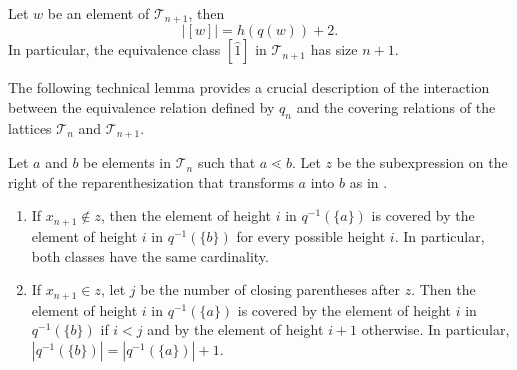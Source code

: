 \documentclass{preprint}
\newcommand{\cT}{\mathcal{T}}
\theoremstyle{definition}
\begin{document}
\begin{corollary}\label{size of equivalence class}
Let $w$ be an element of $\cT_{n+1}$, then \[|[w]| = h(q(w)) + 2.\]
In particular, the equivalence class $[\hat{1}]$ in $\cT_{n+1}$ has size $n+1$.
\end{corollary}

The following technical lemma provides a crucial description of the interaction between the equivalence relation defined by $q_n$ and the covering relations of the lattices $\cT_n$ and $\cT_{n+1}$.

\begin{lemma}\label{lem:banana}
    Let $a$ and $b$ be elements in $\cT_{n}$ such that $a \lessdot b$. Let $z$ be the subexpression on the right of the reparenthesization that transforms $a$ into $b$ as in .
    \begin{enumerate}
        \item If $x_{n+1} \notin z$, then the element of height $i$ in $q^{-1}(\{a\})$ is covered by the element of height $i$ in $q^{-1}(\{b\})$ for every possible height $i$. In particular, both classes have the same cardinality.
        \item If $x_{n+1} \in z$, let $j$ be the number of closing parentheses after $z$. Then the element of height $i$ in $q^{-1}(\{a\})$ is covered by the element of height $i$ in $q^{-1}(\{b\})$ if $i < j$ and by the element of height $i+1$ otherwise. In particular, $|q^{-1}(\{b\})| = |q^{-1}(\{a\})| + 1$.
    \end{enumerate}
\end{lemma}
\end{document}
